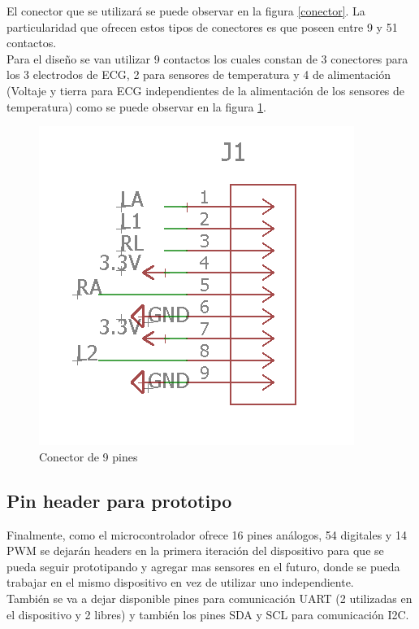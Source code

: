 El conector que se utilizará se puede observar en la figura \ref{conector}. La particularidad que ofrecen estos tipos de conectores es que poseen entre 9 y 51 contactos.\\
Para el diseño se van utilizar 9 contactos los cuales constan de 3 conectores para los 3 electrodos de ECG, 2 para sensores de temperatura y 4 de alimentación (Voltaje y tierra para ECG independientes de la alimentación de los sensores de temperatura) como se puede observar en la figura \ref{coneagle}.

\begin{figure}[H]
\centering
\includegraphics[scale=0.5]{figuras/eagle/sensores.png}
\caption{Conector de 9 pines}
\label{coneagle}
\end{figure}

\subsection{Pin header para prototipo}
Finalmente, como el microcontrolador ofrece 16 pines análogos, 54 digitales y 14 PWM se dejarán headers en la primera iteración del dispositivo para que se pueda seguir prototipando y agregar mas sensores en el futuro, donde se pueda trabajar en el mismo dispositivo en vez de utilizar uno independiente. \\
También se va a dejar disponible pines para comunicación UART (2 utilizadas en el dispositivo y 2 libres) y también los pines SDA y SCL para comunicación I2C. \\

